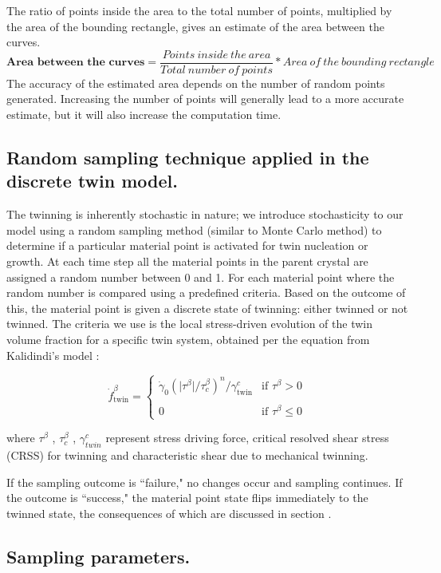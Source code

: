 The ratio of points inside the area to the total number of points, multiplied by the area of the bounding rectangle, gives an estimate of the area between the curves.
\[
\textbf{Area\ between\ the\ curves} = \frac{Points\ inside\ the\ area}{Total\ number\ of\ points} * {Area\ of\ the\ bounding\ rectangle}
\]
The accuracy of the estimated area depends on the number of random points generated. Increasing the number of points will generally lead to a more accurate estimate, but it will also increase the computation time.

\subsection{Random sampling technique applied in the discrete twin model.}
The twinning is inherently stochastic in nature; we introduce stochasticity to our model using a random sampling method (similar to Monte Carlo method) to determine if a particular material point is activated for twin nucleation or growth. At each time step all the material points in the parent crystal are assigned a random number between 0 and 1. For each material point where the random number is compared using a predefined criteria. Based on the outcome of this, the material point is given a discrete state of twinning: either twinned or not twinned. The criteria we use is the local stress-driven evolution of the twin volume fraction for a specific twin system, obtained per the equation from Kalidindi's model \cite{KALIDINDI1998267}:

\[
\dot{f}_\text{twin}^\beta = 
\begin{cases}
\dot{\gamma}_0 \left(\lvert \tau^\beta \rvert/\tau^{\beta}_c\right)^n/\gamma^c_\text{twin} & \text{if } \tau^\beta > 0 \\\\
0 & \text{if } \tau^\beta \leq 0
\end{cases}
\]

where $\tau^{\beta}$ , $\tau_c^{\beta}$ , $\gamma_{twin}^c$ represent stress driving force, critical resolved shear stress (CRSS) for twinning and characteristic shear due to mechanical twinning.

If the sampling outcome is “failure," no changes occur and sampling continues. If the outcome is “success," the material point state flips immediately to the twinned state, the consequences of which are discussed in section .

\subsection{Sampling parameters.}
